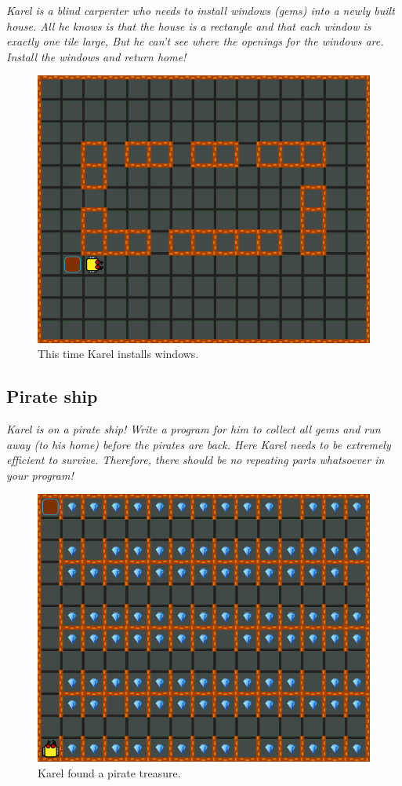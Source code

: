 {\em Karel is a blind carpenter who needs to install windows (gems) into a newly built house. All he knows is that the house is a rectangle and that each window is exactly one tile large, But he can't see where the openings for the windows are. Install the windows and return home!}


\begin{figure}[!ht]
\begin{center}
\includegraphics[height=0.4\textwidth]{img/f04.png}
\end{center}
\vspace{-4mm}
\caption{This time Karel installs windows.}
\label{fig:f04}
\end{figure}
\vspace{-1cm}



\subsection{Pirate ship}

{\em Karel is on a pirate ship! Write a program for him to collect all 
gems and run away (to his home) before the pirates are back. Here Karel 
needs to be extremely efficient to survive. Therefore, there should be 
no repeating parts whatsoever in your program!}\\[-7mm]

\begin{figure}[!ht]
\begin{center}
\includegraphics[height=0.4\textwidth]{img/f05.png}
\end{center}
\vspace{-4mm}
\caption{Karel found a pirate treasure.}
\label{fig:f05}
\vspace{-1cm}
\end{figure}
\newpage


